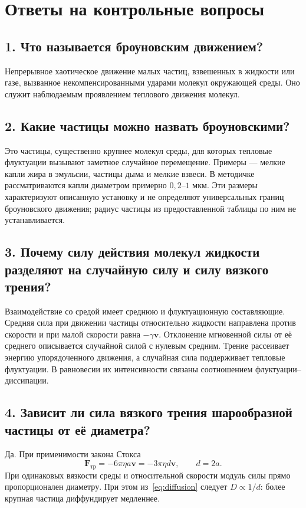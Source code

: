 \documentclass[12pt,a4paper]{article}
\begin{document}
\section{Ответы на контрольные вопросы}
\subsection*{1. Что называется броуновским движением?}
Непрерывное хаотическое движение малых частиц, взвешенных в жидкости
или газе, вызванное некомпенсированными ударами молекул окружающей среды.
Оно служит наблюдаемым проявлением теплового движения молекул.

\subsection*{2. Какие частицы можно назвать броуновскими?}
Это частицы, существенно крупнее молекул среды, для которых тепловые
флуктуации вызывают заметное случайное перемещение. Примеры --- мелкие
капли жира в эмульсии, частицы дыма и мелкие взвеси.
В методичке рассматриваются капли диаметром примерно $0{,}2$--$1$ мкм.
Эти размеры характеризуют описанную установку и не определяют универсальных
границ броуновского движения; радиус частицы из предоставленной таблицы
по ним не устанавливается.

\subsection*{3. Почему силу действия молекул жидкости разделяют на
случайную силу и силу вязкого трения?}
Взаимодействие со средой имеет среднюю и флуктуационную составляющие.
Средняя сила при движении частицы относительно жидкости направлена
против скорости и при малой скорости равна $-\gamma\mathbf v$.
Отклонение мгновенной силы от её среднего описывается случайной силой
с нулевым средним. Трение рассеивает энергию упорядоченного движения,
а случайная сила поддерживает тепловые флуктуации. В равновесии их
интенсивности связаны соотношением флуктуации--диссипации.

\subsection*{4. Зависит ли сила вязкого трения шарообразной частицы
от её диаметра?}
Да. При применимости закона Стокса
\[
 \mathbf F_{\mathrm{тр}}=-6\pi\eta a\mathbf v
 =-3\pi\eta d\mathbf v,\qquad d=2a.
\]
При одинаковых вязкости среды и относительной скорости модуль силы
прямо пропорционален диаметру. При этом из~\eqref{eq:diffusion}
следует $D\propto1/d$: более крупная частица диффундирует медленнее.
\end{document}
